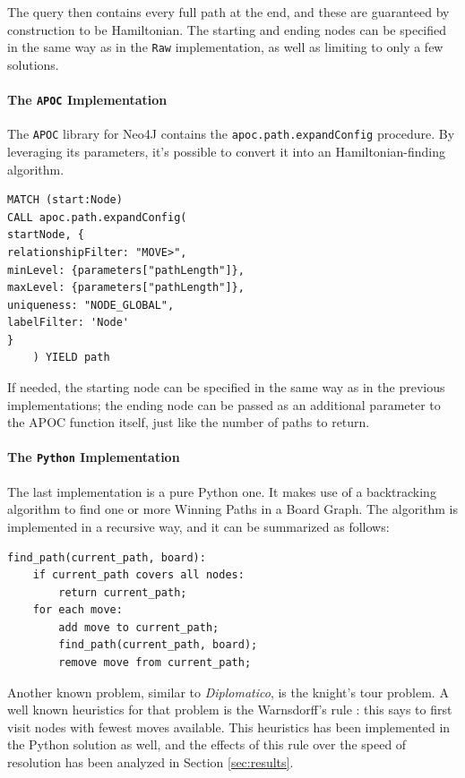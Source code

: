 \documentclass[conference]{IEEEtran}
\begin{document}
The query then contains every full path at the end, and these are guaranteed by construction to be Hamiltonian.
The starting and ending nodes can be specified in the same way as in the \texttt{Raw} implementation, as well as limiting to only a few solutions.

\paragraph{The \texttt{APOC} Implementation}
The \texttt{APOC} library \cite{apoc} for Neo4J contains the \texttt{apoc.path.expandConfig} procedure. By leveraging its parameters, it's possible to convert it into an Hamiltonian-finding algorithm.
\begin{tcolorbox}[colback=yellow!5!white, colframe=yellow!50!black]
\begin{verbatim}
MATCH (start:Node)
CALL apoc.path.expandConfig(
startNode, {
relationshipFilter: "MOVE>",
minLevel: {parameters["pathLength"]},
maxLevel: {parameters["pathLength"]},
uniqueness: "NODE_GLOBAL",
labelFilter: 'Node'
}
    ) YIELD path
\end{verbatim}
\end{tcolorbox}

If needed, the starting node can be specified in the same way as in the previous implementations; the ending node can be passed as an additional parameter to the APOC function itself, just like the number of paths to return.

\paragraph{The \texttt{Python} Implementation}
The last implementation is a pure Python one. It makes use of a backtracking algorithm to find one or more Winning Paths in a Board Graph.
The algorithm is implemented in a recursive way, and it can be summarized as follows:
\begin{tcolorbox}[colback=yellow!5!white, colframe=yellow!50!black]
\begin{verbatim}
find_path(current_path, board):
    if current_path covers all nodes:
        return current_path;
    for each move:
        add move to current_path;
        find_path(current_path, board);
        remove move from current_path;
\end{verbatim}
\end{tcolorbox}

Another known problem, similar to \textit{Diplomatico}, is the knight's tour problem.
A well known heuristics for that problem is the Warnsdorff's rule \cite{warnsdorff}: this says to first visit nodes with fewest moves available.
This heuristics has been implemented in the Python solution as well, and the effects of this rule over the speed of resolution has been analyzed in Section \ref{sec:results}.
\end{document}
